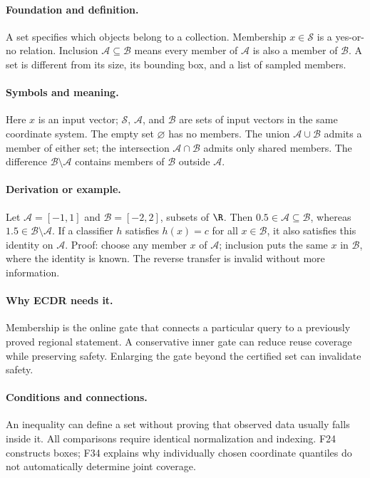 \paragraph{Foundation and definition.}
A set specifies which objects belong to a collection. Membership
$x\in\mathcal S$ is a yes-or-no relation. Inclusion
$\mathcal A\subseteq\mathcal B$ means every member of $\mathcal A$ is
also a member of $\mathcal B$. A set is different from its size, its
bounding box, and a list of sampled members.
\paragraph{Symbols and meaning.}
Here $x$ is an input vector; $\mathcal S$, $\mathcal A$, and
$\mathcal B$ are sets of input vectors in the same coordinate system.
The empty set $\varnothing$ has no members. The union
$\mathcal A\cup\mathcal B$ admits a member of either set; the
intersection $\mathcal A\cap\mathcal B$ admits only shared members.
The difference $\mathcal B\setminus\mathcal A$ contains members of
$\mathcal B$ outside $\mathcal A$.
\paragraph{Derivation or example.}
Let $\mathcal A=[-1,1]$ and $\mathcal B=[-2,2]$, subsets of $\R$.
Then $0.5\in\mathcal A\subseteq\mathcal B$, whereas
$1.5\in\mathcal B\setminus\mathcal A$. If a classifier $h$ satisfies
$h(x)=c$ for all $x\in\mathcal B$, it also satisfies this identity on
$\mathcal A$. Proof: choose any member $x$ of $\mathcal A$; inclusion
puts the same $x$ in $\mathcal B$, where the identity is known.
The reverse transfer is invalid without more information.
\paragraph{Why ECDR needs it.}
Membership is the online gate that connects a particular query to a
previously proved regional statement. A conservative inner gate can
reduce reuse coverage while preserving safety. Enlarging the gate beyond
the certified set can invalidate safety.
\paragraph{Conditions and connections.}
An inequality can define a set without proving that observed data usually
falls inside it. All comparisons require identical normalization and
indexing. F24 constructs boxes; F34 explains why individually chosen
coordinate quantiles do not automatically determine joint coverage.

